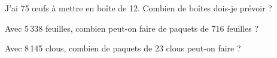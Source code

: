 \begin{myenumerate}
  \item J'ai 75 \oe ufs à mettre en boîte de 12. Combien de boîtes
dois-je prévoir ?
\item Avec 5\,338 feuilles, combien peut-on faire de paquets de 716
feuilles ? 
\item Avec 8\,145 clous, combien de paquets de 23 clous peut-on faire
?
\end{myenumerate}
